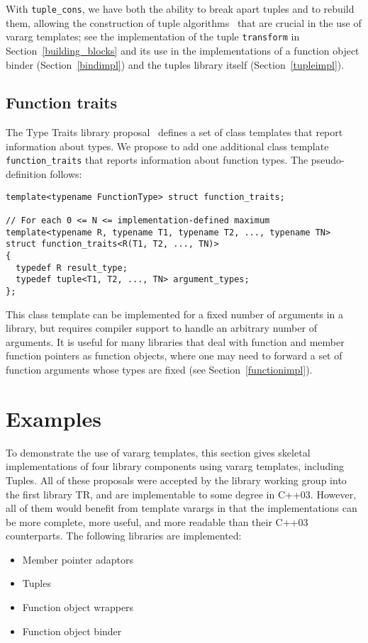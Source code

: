 \documentclass{article}
\begin{document}
With {\tt tuple\_cons}, we have both the ability to break apart tuples
and to rebuild them, allowing the construction of tuple
algorithms~\cite{TupleAlgo} that are crucial in the use of vararg
templates; see the implementation of the tuple {\tt transform} in
Section~\ref{building_blocks} and its use in the implementations of a
function object binder (Section~\ref{bindimpl}) and the tuples library
itself (Section~\ref{tupleimpl}).

\subsection{Function traits}
The Type Traits library proposal~\cite{Maddock03} defines a set of
class templates that report information about types. We propose to add
one additional class template {\tt function\_traits} that reports
information about function types. The pseudo-definition follows:
\begin{verbatim}
template<typename FunctionType> struct function_traits;

// For each 0 <= N <= implementation-defined maximum
template<typename R, typename T1, typename T2, ..., typename TN>
struct function_traits<R(T1, T2, ..., TN)>
{
  typedef R result_type;
  typedef tuple<T1, T2, ..., TN> argument_types;
};
\end{verbatim}

This class template can be implemented for a fixed number of
arguments in a library, but requires compiler support to handle an
arbitrary number of arguments. It is useful for many libraries that
deal with function and member function pointers as function objects,
where one may need to forward a set of function arguments whose types
are fixed (see Section~\ref{functionimpl}).

\section{Examples}
To demonstrate the use of vararg templates, this section gives
skeletal implementations of four library components using vararg
templates, including Tuples. All of these proposals were accepted by
the library working group into the first library TR, and are
implementable to some degree in C++03. However, all of them would
benefit from template varargs in that the implementations can be more
complete, more useful, and more readable than their C++03
counterparts. The following libraries are implemented:

\begin{itemize}
\item Member pointer adaptors~\cite{Dimov03a}
\item Tuples~\cite{Jarvi02}
\item Function object wrappers~\cite{Gregor02}
\item Function object binder~\cite{Dimov03b}
\end{itemize}
\end{document}
